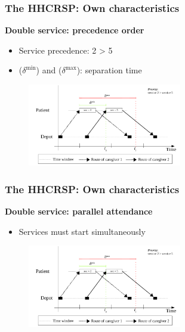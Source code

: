 \begin{frame}
   \frametitle{The HHCRSP: Own characteristics}
   \textbf{Double service: precedence order}
   \begin{itemize}
      \item Service precedence: 2 > 5
      \item ($\delta^\mathrm{min}$) and ($\delta^\mathrm{max}$): separation time
   \end{itemize}

   \begin{figure}
      \centering
      \includegraphics[width=0.6\textwidth,page=1]{fig/sync-tsn2}
   \end{figure}
\end{frame}

\begin{frame}
   \frametitle{The HHCRSP: Own characteristics}
   \textbf{Double service: parallel attendance}
   \begin{itemize}
      \item Services must start simultaneously
   \end{itemize}

   \begin{figure}
      \centering
      \includegraphics[width=0.6\textwidth,page=2]{fig/sync-tsn2}
   \end{figure}
\end{frame}

